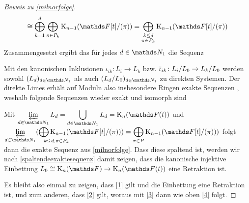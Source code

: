 \documentclass[ngerman,fontsize=11pt, paper=a4, parskip=half, titlepage=true, toc=bib]{scrartcl}
\begin{document}
\begin{proof}[Beweis zu \ref{milnorfolge}]
\begin{align}
    \cong \bigoplus_{k=1}^d\bigoplus_{\pi\in P_k} \K_{n-1}(\F[t]/(\pi))
    = \bigoplus_{\substack{k\leq d\\\pi\in P_k}}
    \K_{n-1}(\F[t]/(\pi))
  \end{align}
  Zusammengesetzt ergibt das für jedes $d\in\N_1$ die Sequenz
  \begin{center}
  \end{center}
  Mit den kanonischen Inklusionen $\iota_{ik}\colon L_i\to L_k$ 
  bzw. $\overline{\iota}_{ik}\colon L_i/L_0\to L_k/L_0$ werden
  sowohl $(L_d)_{d\in\N_1}$ als auch $(L_d/L_0)_{d\in\N_1}$
  zu direkten Systemen.
  Der direkte Limes erhält auf Moduln also insbesondere Ringen exakte
  Sequenzen 
  \cite[siehe][III. §6.2, Prop. 3]{bourbaki},
  weshalb folgende Sequenzen wieder exakt und isomorph sind
  \begin{center}
  \end{center}
  Mit
  $\displaystyle\varprojlim_{d\in\N_1}L_d=\bigcup_{d\in\N_1}L_d=\KnFt$ 
  und
  $\displaystyle\varprojlim_{d\in\N_1}(\bigoplus_{\mathrlap{k\leq d, \pi\in P_k}}
  \K_{n-1}(\F[t]/(\pi)))
  =\bigoplus_{\pi\in P}
  \K_{n-1}(\F[t]/(\pi)))$
  folgt dann die exakte Sequenz aus \ref{milnorfolge}.
  Dass diese spaltend ist, werden wir nach
  \ref{spaltendeexaktesequenz} damit zeigen, dass
  die kanonische injektive Einbettung $L_0\cong\KnF\to\KnFt$ 
  eine Retraktion ist.

  Es bleibt also einmal zu zeigen, dass \ref{1} gilt und die Einbettung eine
  Retraktion ist, und zum anderen, dass \ref{2} gilt, woraus mit \ref{3} dann wie
  oben \ref{4} folgt.
  
\end{proof}
\end{document}
